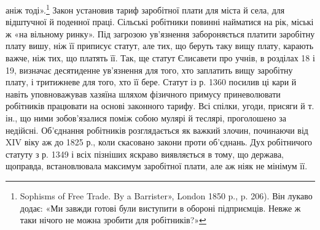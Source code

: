 \parcont{}  %
аніж тоді».\footnote{
Sophisms of Free Trade. By a Barrister», London 1850 p., p. 206).
Він лукаво додає: «Ми завжди готові були виступити в обороні підприємців.
Невже ж таки нічого не можна зробити для робітників?»
} Закон установив тариф заробітної плати для міста
й села, для відштучної й поденної праці. Сільські робітники
повинні найматися на рік, міські ж «на вільному ринку». Під
загрозою ув’язнення забороняється платити заробітну плату
вишу, ніж її приписує статут, але тих, що беруть таку вищу
плату, карають важче, ніж тих, що платять її. Так, ще статут
Єлисавети про учнів, в розділах 18 і 19, визначає десятиденне
ув’язнення для того, хто заплатить вищу заробітну плату, і
тритижневе для того, хто її бере. Статут із р. 1360 посилив ці
кари й навіть уповноважував хазяїна шляхом фізичного примусу
приневолювати робітників працювати на основі законного тарифу.
Всі спілки, угоди, присяги й т. ін., що ними зобов’язалися поміж
собою мулярі й теслярі, проголошено за недійсні. Об’єднання
робітників розглядається як важкий злочин, починаючи від
XIV віку аж до 1825 р., коли скасовано закони проти об’єднань.
Дух робітничого статуту з р. 1349 і всіх пізніших яскраво виявляється
в тому, що держава, щоправда, встановлювала максимум
заробітної плати, але аж ніяк не мінімум її.

